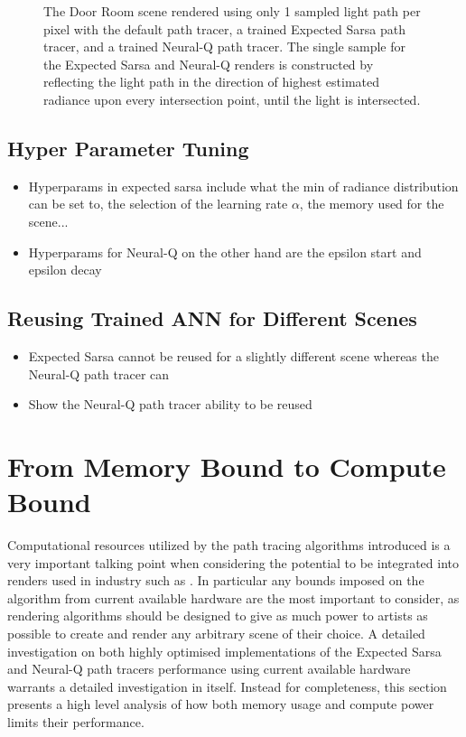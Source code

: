 \documentclass[../dissertation.tex]{subfiles}
\begin{document}
\begin{figure}[h]
  \label{fig:neural_q_1_spp}
\endminipage
\caption{The Door Room scene rendered using only 1 sampled light path per pixel with the default path tracer, a trained Expected Sarsa path tracer, and a trained Neural-Q path tracer. The single sample for the Expected Sarsa and Neural-Q renders is constructed by reflecting the light path in the direction of highest estimated radiance upon every intersection point, until the light is intersected.}
\label{fig:1_spp_max_dir}
\end{figure}

\subsection{Hyper Parameter Tuning}
\begin{itemize}
\item Hyperparams in expected sarsa include what the min of radiance distribution can be set to, the selection of the learning rate $\alpha$, the memory used for the scene...
\item Hyperparams for Neural-Q on the other hand are the epsilon start and epsilon decay
\end{itemize}

\subsection{Reusing Trained ANN for Different Scenes}
\begin{itemize}
\item Expected Sarsa cannot be reused for a slightly different scene whereas the Neural-Q path tracer can 
\item Show the Neural-Q path tracer ability to be reused
\end{itemize}


\section{From Memory Bound to Compute Bound}

Computational resources utilized by the path tracing algorithms introduced is a very important talking point when considering the potential to be integrated into renders used in industry such as \cite{georgiev2018arnold, christensen2018renderman, hyperion}. In particular any bounds imposed on the algorithm from current available hardware are the most important to consider, as rendering algorithms should be designed to give as much power to artists as possible to create and render any arbitrary scene of their choice. A detailed investigation on both highly optimised implementations of the Expected Sarsa and Neural-Q path tracers performance using current available hardware warrants a detailed investigation in itself. Instead for completeness, this section presents a high level analysis of how both memory usage and compute power limits their performance.
\end{document}
